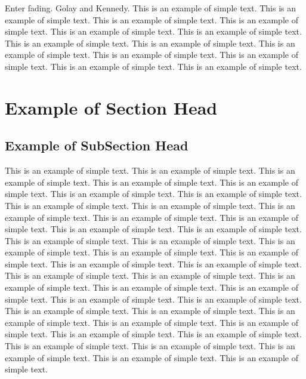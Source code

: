 \documentclass[11pt]{now}
\begin{document}
Enter fading. Golay\cite{golay49} and Kennedy\cite{kennedy69}.
This is an example of simple text.
This is an example of simple text. This is an example of simple text.
This is an example of simple text. This is an example of simple text.
This is an example of simple text. This is an example of simple text.
This is an example of simple text. This is an example of simple text.
This is an example of simple text. This is an example of simple text.
This is an example of simple text. This is an example of simple text.


\section{Example of Section Head}

\subsection{Example of SubSection Head}

This is an example of simple text. This is an example of simple text.
This is an example of simple text. This is an example of simple text.
This is an example of simple text. This is an example of simple text.
This is an example of simple text. This is an example of simple text.
This is an example of simple text. This is an example of simple text.
This is an example of simple text. This is an example of simple text.
This is an example of simple text. This is an example of simple text.
This is an example of simple text. This is an example of simple text.
This is an example of simple text. This is an example of simple text.
This is an example of simple text. This is an example of simple text.
This is an example of simple text. This is an example of simple text.
This is an example of simple text. This is an example of simple text.
This is an example of simple text. This is an example of simple text.
This is an example of simple text. This is an example of simple text.
This is an example of simple text. This is an example of simple text.
This is an example of simple text. This is an example of simple text.
This is an example of simple text. This is an example of simple text.
This is an example of simple text. This is an example of simple text.
This is an example of simple text. This is an example of simple text.
This is an example of simple text. This is an example of simple text.
\end{document}
